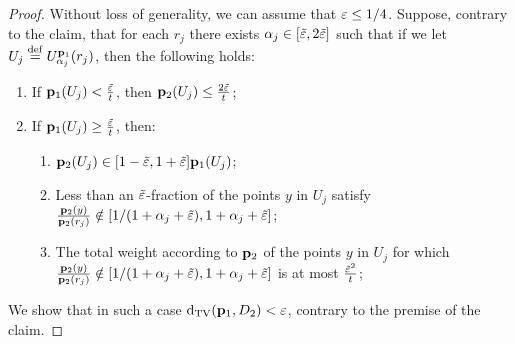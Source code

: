 \begin{proof}
Without loss of generality, we can assume that \mbox{$\varepsilon\leq 1/4$}.
Suppose, contrary to the claim, that
for each $r_j$ there exists $\alpha_j \in [\tilde{\varepsilon},2\tilde{\varepsilon}]$ such
that if we let $U_j \stackrel{\rm def}{=} U^{\mathbf{p}_1}_{\alpha_j}(r_j)$, then the following holds:
\begin{enumerate}
\item  If $\mathbf{p}_1(U_j) < \frac{\tilde{\varepsilon}}{t}$, then
      $\mathbf{p}_2(U_j) \leq \frac{2\tilde{\varepsilon}}{t}$;
\item If $\mathbf{p}_1(U_j) \geq \frac{\tilde{\varepsilon}}{t}$, then:
  \begin{enumerate}
  \item $\mathbf{p}_2(U_j)
           \in [1-\tilde{\varepsilon},1+\tilde{\varepsilon}]\mathbf{p}_1(U_j)$;
 \item   Less than an $\tilde{\varepsilon}$-fraction of the points $y$
      in $U_j$ satisfy
      \mbox{$\frac{\mathbf{p}_2(y)}{\mathbf{p}_2(r_j)}
        \notin\left[1/(1+\alpha_j+\tilde{\varepsilon}), 1+\alpha_j+\tilde{\varepsilon}\right]$};
 \item
      The total weight according to $\mathbf{p}_2$ of the points $y$
      in $U_j$ for which
      \mbox{$\frac{\mathbf{p}_2(y)}{\mathbf{p}_2(r_j)}
        \notin\left[1/(1+\alpha_j+\tilde{\varepsilon}), 1+\alpha_j+\tilde{\varepsilon}\right]$}
      is at most $\frac{\tilde{\varepsilon}^2}{t}$;
 \end{enumerate}
\end{enumerate}
We show that in such a case $\operatorname{d}_{\rm{TV}}(\mathbf{p}_1,D_2) < \varepsilon$, contrary to
the premise of the claim.



\end{proof}
